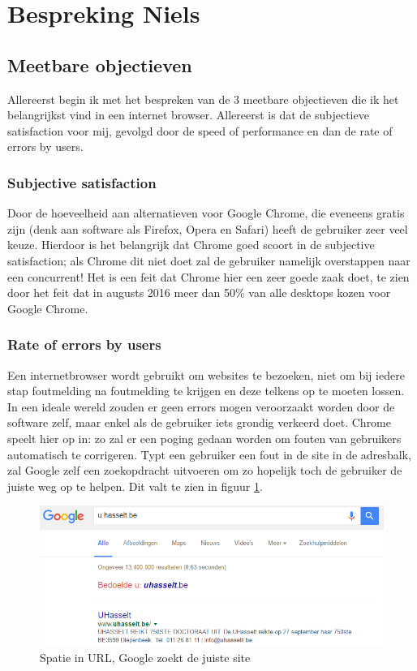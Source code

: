 \documentclass[12pt]{article}
\begin{document}
\section{Bespreking Niels}
\subsection{Meetbare objectieven}
Allereerst begin ik met het bespreken van de 3 meetbare objectieven die ik het belangrijkst vind in een internet browser. Allereerst is dat de subjectieve satisfaction voor mij, gevolgd door de speed of performance en dan de rate of errors by users.
\subsubsection{Subjective satisfaction}
Door de hoeveelheid aan alternatieven voor Google Chrome, die eveneens gratis zijn (denk aan software als Firefox, Opera en Safari) heeft de gebruiker zeer veel keuze. Hierdoor is het belangrijk dat Chrome goed scoort in de subjective satisfaction; als Chrome dit niet doet zal de gebruiker namelijk overstappen naar een concurrent! Het is een feit dat Chrome hier een zeer goede zaak doet, te zien door het feit dat in augusts 2016 meer dan 50\% van alle desktops kozen voor Google Chrome.\cite{NetShare}
\subsubsection{Rate of errors by users}
Een internetbrowser wordt gebruikt om websites te bezoeken, niet om bij iedere stap foutmelding na foutmelding te krijgen en deze telkens op te moeten lossen. In een ideale wereld zouden er geen errors mogen veroorzaakt worden door de software zelf, maar enkel als de gebruiker iets grondig verkeerd doet. Chrome speelt hier op in: zo zal er een poging gedaan worden om fouten van gebruikers automatisch te corrigeren. Typt een gebruiker een fout in de site in de adresbalk, zal Google zelf een zoekopdracht uitvoeren om zo hopelijk toch de gebruiker de juiste weg op te helpen. Dit valt te zien in figuur \ref{fig:search}.
\begin{figure}
	\centering
	\includegraphics[width=1\textwidth]{search.png}
	\caption{Spatie in URL, Google zoekt de juiste site}
	\label{fig:search}
\end{figure}
\newpage
\end{document}

